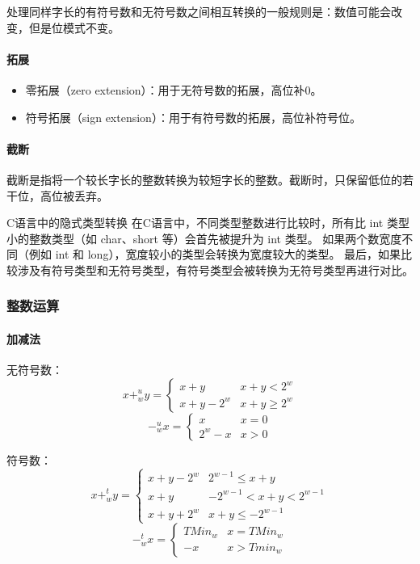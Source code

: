 处理同样字长的有符号数和无符号数之间相互转换的一般规则是：数值可能会改变，但是位模式不变。

\paragraph{拓展}
\begin{itemize}
    \item 零拓展（zero extension）：用于无符号数的拓展，高位补0。
    \item 符号拓展（sign extension）：用于有符号数的拓展，高位补符号位。
\end{itemize}
\paragraph{截断}
截断是指将一个较长字长的整数转换为较短字长的整数。截断时，只保留低位的若干位，高位被丢弃。

\begin{sidenote}{C语言中的隐式类型转换}
    在C语言中，不同类型整数进行比较时，所有比 int 类型小的整数类型（如 char、short 等）会首先被提升为 int 类型。
    如果两个数宽度不同（例如 int 和 long），宽度较小的类型会转换为宽度较大的类型。
    最后，如果比较涉及有符号类型和无符号类型，有符号类型会被转换为无符号类型再进行对比。
\end{sidenote}

\subsubsection{整数运算}
\paragraph{加减法}

无符号数：
$$
    x +_w^u y =
    \begin{cases}
        x + y       & x + y < 2^w    \\
        x + y - 2^w & x + y \geq 2^w
    \end{cases}
$$
$$
    -_w^u x =
    \begin{cases}
        x       & x = 0 \\
        2^w - x & x > 0
    \end{cases}
$$

符号数：
$$
    x +_w^t y =
    \begin{cases}
        x + y - 2^w & 2^{w-1} \leq x + y         \\
        x + y       & -2^{w-1} < x + y < 2^{w-1} \\
        x + y + 2^w & x + y \leq -2^{w-1}
    \end{cases}
$$
$$
    -_w^t x =
    \begin{cases}
        TMin_w & x = TMin_w \\
        - x    & x > Tmin_w
    \end{cases}
$$
